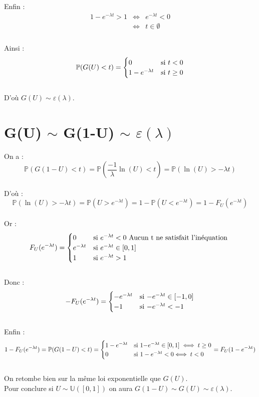 \documentclass[12,french]{report}
\begin{document}
Enfin :
$$\begin{array}{ccl}
	1-e^{-\lambda t}>1 & \iff & e^{-\lambda t}<0 \\
	& \iff & t\in\emptyset \\
  \end{array}$$\\
  
Ainsi :
$$\mathbb{P}(G(U)<t)=\begin{cases}
0 & \text{si \ensuremath{t<0}}\\
1-e^{-\lambda t} & \text{si }t\geq0
\end{cases}$$\\

D'où $G(U) \sim \varepsilon(\lambda)$.
 
\chapter{G(U) $\sim$ G(1-U) $\sim$ $\varepsilon(\lambda)$}

On a :
$$\mathbb{P}(G(1-U)<t)=\mathbb{P}(\frac{-1}{\lambda}\ln(U)<t)=\mathbb{P}(\ln(U)>-\lambda t)$$\\
D'où : $$\mathbb{P}(\ln(U)>-\lambda t)=\mathbb{P}(U>e^{-\lambda t})=1-\mathbb{P}(U<e^{-\lambda t})=1-F_{U}(e^{-\lambda t})$$\\

Or : $$F_{U}(e^{-\lambda t})=\begin{cases}
0 & \text{si \ensuremath{e^{-\lambda t}<0}}\text{ Aucun t ne satisfait l'inéquation }\\
e^{-\lambda t} & \text{si \ensuremath{e^{-\lambda t}}}\in[0,1]\\
1 & \text{si \ensuremath{e^{-\lambda t}>1}}
\end{cases}$$\\
Donc :
$$-F_{U}(e^{-\lambda t})=\begin{cases}
-e^{-\lambda t} & \text{si \ensuremath{-}\ensuremath{e^{-\lambda t}}}\in[-1,0]\\
-1 & \text{si \ensuremath{-e^{-\lambda t}<-1}}
\end{cases}$$\\
Enfin :
$$1-F_{U}(e^{-\lambda t})=\mathbb{P}(G(1-U)<t)=\begin{cases}
1-e^{-\lambda t} & \text{si \ensuremath{1-}\ensuremath{e^{-\lambda t}}}\in[0,1]\iff t\geq0\\
0 & \text{si \ensuremath{1-e^{-\lambda t}<0}\ensuremath{\iff t<0}}
\end{cases}=F_{U}(1-e^{-\lambda t})$$\\

On retombe bien sur la même loi exponentielle que $G(U)$. \\

Pour conclure si $U\sim\mathbb{U}([0,1])$ on aura $G(1-U) \sim G(U)\sim \varepsilon(\lambda)$.
\end{document}

